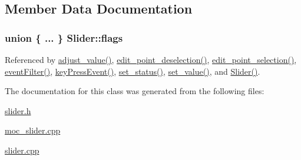 \subsection{Member Data Documentation}
\hypertarget{a00077_ade6449558d429b66e5ed1381bc9b9060}{
\subsubsection[{flags}]{\setlength{\rightskip}{0pt plus 5cm}union \{ ... \}  Slider\+::flags}}\label{a00077_ade6449558d429b66e5ed1381bc9b9060}


Referenced by \hyperlink{a00133_source_l00069}{adjust\+\_\+value()}, \hyperlink{a00133_source_l00063}{edit\+\_\+point\+\_\+deselection()}, \hyperlink{a00133_source_l00057}{edit\+\_\+point\+\_\+selection()}, \hyperlink{a00133_source_l00251}{event\+Filter()}, \hyperlink{a00133_source_l00219}{key\+Press\+Event()}, \hyperlink{a00133_source_l00379}{set\+\_\+status()}, \hyperlink{a00133_source_l00102}{set\+\_\+value()}, and \hyperlink{a00133_source_l00014}{Slider()}.



The documentation for this class was generated from the following files\+:\begin{DoxyCompactItemize}
\item 
\hyperlink{a00078}{slider.\+h}\item 
\hyperlink{a00070}{moc\+\_\+slider.\+cpp}\item 
\hyperlink{a00133}{slider.\+cpp}\end{DoxyCompactItemize}
